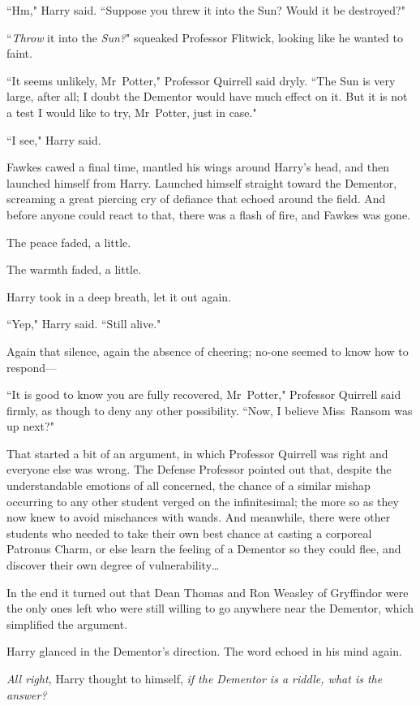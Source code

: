 ``Hm," Harry said. ``Suppose you threw it into the Sun? Would it be destroyed?"

``\emph{Throw} it into the \emph{Sun?}" squeaked Professor Flitwick, looking like he wanted to faint.

``It seems unlikely, Mr~Potter," Professor Quirrell said dryly. ``The Sun is very large, after all; I doubt the Dementor would have much effect on it. But it is not a test I would like to try, Mr~Potter, just in case."

``I see," Harry said.

Fawkes cawed a final time, mantled his wings around Harry's head, and then launched himself from Harry. Launched himself straight toward the Dementor, screaming a great piercing cry of defiance that echoed around the field. And before anyone could react to that, there was a flash of fire, and Fawkes was gone.

The peace faded, a little.

The warmth faded, a little.

Harry took in a deep breath, let it out again.

``Yep," Harry said. ``Still alive."

Again that silence, again the absence of cheering; no-one seemed to know how to respond—

``It is good to know you are fully recovered, Mr~Potter," Professor Quirrell said firmly, as though to deny any other possibility. ``Now, I believe Miss~Ransom was up next?"

That started a bit of an argument, in which Professor Quirrell was right and everyone else was wrong. The Defense Professor pointed out that, despite the understandable emotions of all concerned, the chance of a similar mishap occurring to any other student verged on the infinitesimal; the more so as they now knew to avoid mischances with wands. And meanwhile, there were other students who needed to take their own best chance at casting a corporeal Patronus Charm, or else learn the feeling of a Dementor so they could flee, and discover their own degree of vulnerability{\ldots}

In the end it turned out that Dean Thomas and Ron Weasley of Gryffindor were the only ones left who were still willing to go anywhere near the Dementor, which simplified the argument.

Harry glanced in the Dementor's direction. The word echoed in his mind again.

\emph{All right,} Harry thought to himself, \emph{if the Dementor is a riddle, what is the answer?}

